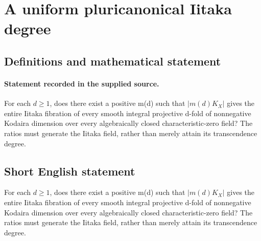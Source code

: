 \documentclass[11pt]{article}
\begin{document}
\section*{A uniform pluricanonical Iitaka degree}\label{statement}
\subsection{Definitions and mathematical statement}
\paragraph{Statement recorded in the supplied source.}
For each $d\geq 1$, does there exist a positive m(d) such that $|m(d)K_X|$ gives the entire Iitaka fibration of every smooth integral projective d-fold of nonnegative Kodaira dimension over every algebraically closed characteristic-zero field? The ratios must generate the Iitaka field, rather than merely attain its transcendence degree.
\subsection{Short English statement}
For each $d\geq 1$, does there exist a positive m(d) such that $|m(d)K_X|$ gives the entire Iitaka fibration of every smooth integral projective d-fold of nonnegative Kodaira dimension over every algebraically closed characteristic-zero field? The ratios must generate the Iitaka field, rather than merely attain its transcendence degree.
\end{document}
